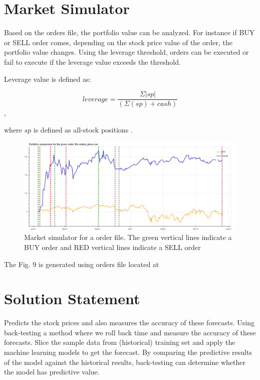 \documentclass[12pt]{article}
\begin{document}
\begin{itemize}
\section{Market Simulator}
\label{sec:sim}
Based on the orders file, the portfolio value can be analyzed. For instance if BUY or SELL order comes, depending on the stock price value of the order, the portfolio value changes. Using the leverage threshold, orders can be executed or fail to execute if the leverage value exceeds the threshold.

Leverage value is defined as:

\[ leverage = \frac{\Sigma|sp|} {(\Sigma(sp) + cash) }\],

where $sp$ is defined as all-stock positions \cite{GeTechCourse}. 

\begin{figure}[!htbp]
\label{fig:optimized}
\begin{center}
\includegraphics[height=0.5\textheight,width=\textwidth]{market.png}
\caption{Market simulator for a order file. The green vertical lines indicate a BUY order and RED vertical lines indicate a SELL order }
\end{center}
\end{figure}

The Fig. 9 is generated using orders file located at \href{https://github.com/beegeesquare/QuantFy/blob/master/orders/orders_demo.csv}{\color{blue}{\bf Orders-demo}}

\section{Solution Statement}
\label{sec:solution}
Predicts the stock prices and also measures the accuracy of these forecasts. Using back-testing a method where we roll back time and measure the accuracy of these forecasts.  Slice the sample data from (historical) training set and apply the machine learning models to get the forecast.  By comparing the predictive results of the model against the historical results,  back-testing can determine whether the model has predictive value. 


\end{itemize}
\end{document}
